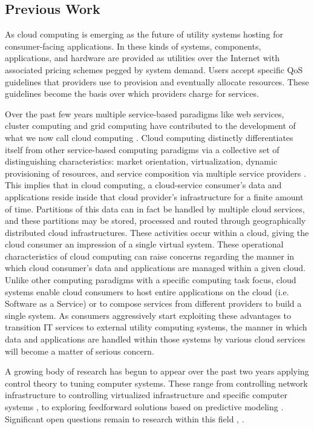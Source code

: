 \subsection{Previous Work}
As cloud computing is emerging as the future of utility systems hosting for consumer-facing applications.  In these kinds of systems, components, applications, and hardware are provided as utilities over the Internet with associated pricing schemes pegged by system demand.  Users accept specific QoS guidelines that providers use to provision and eventually allocate resources. These guidelines become the basis over which providers charge for services.

Over the past few years multiple service-based paradigms like web services, cluster computing and grid computing have contributed to the development of what we now call cloud computing \cite{Bu:09}. Cloud computing distinctly differentiates itself from other service-based computing paradigms via a collective set of distinguishing characteristics:  market orientation, virtualization, dynamic provisioning of resources, and service composition via multiple service providers \cite{BuYeVeBrBr:09}. This implies that in cloud computing, a cloud-service consumer's data and applications reside inside that cloud provider's infrastructure for a finite amount of time.  Partitions of this data can in fact be handled by multiple cloud services, and these partitions may be stored, processed and routed through geographically distributed cloud infrastructures. These activities occur within a cloud, giving the cloud consumer an impression of a single virtual system.  These operational characteristics of cloud computing can raise concerns regarding the manner in which cloud consumer's data and applications are managed within a given cloud. Unlike other computing paradigms with a specific computing task focus, cloud systems enable cloud consumers to host entire applications on the cloud (i.e. Software as a Service) or to compose services from different providers to build a single system. As consumers aggressively start exploiting these advantages to transition IT services to external utility computing systems, the manner in which data and applications are handled within those systems by various cloud services will become a matter of serious concern.

A growing body of research has begun to appear over the past two years applying control theory to tuning computer systems.  These range from controlling network infrastructure \cite{ctrl:ariba-GL:2009} to controlling virtualized infrastructure and specific computer systems \cite{ctrl:wang-cgswrzh:2009}, \cite{ctrl:kjaer-kr:2009} to exploring feedforward solutions based on predictive modeling \cite{ctrl:abdelwahed-bsk:2009}.  Significant open questions remain to research within this field \cite{ctrl:Zhu:2009:CTB:1496909.1496922}, \cite{ctrl:hellerstein-sw:2009}.
